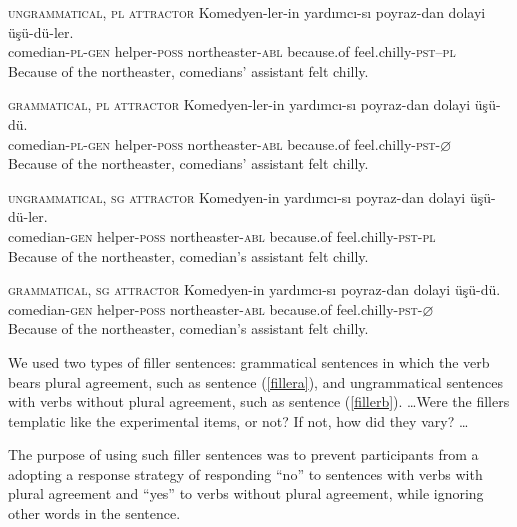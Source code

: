 \documentclass[english,doc]{apa6}
\begin{document}
\begin{exe}
\ex \label{exp1_item}
  \begin{xlist}

  \ex \textsc{ungrammatical, pl attractor} \label{exp1_a}
      \gll Komedyen-ler-in yardımcı-sı poyraz-dan dolayi ü\c{s}ü-dü-ler.\\
  comedian-\textsc{pl}-\textsc{gen} helper-\textsc{poss} northeaster-\textsc{abl} because.of feel.chilly-\textsc{pst}--\textsc{pl}\\
      \glt Because of the northeaster, comedians' assistant felt chilly.

  \ex \textsc{grammatical, pl attractor} \label{exp1_b}
      \gll Komedyen-ler-in yardımcı-sı poyraz-dan dolayi ü\c{s}ü-dü.\\
  comedian-\textsc{pl}-\textsc{gen} helper-\textsc{poss} northeaster-\textsc{abl} because.of feel.chilly-\textsc{pst}-$\varnothing$\\
      \glt Because of the northeaster, comedians' assistant felt chilly.

  \ex \textsc{ungrammatical, sg attractor} \label{exp1_c}
      \gll Komedyen-in yardımcı-sı poyraz-dan dolayi ü\c{s}ü-dü-ler.\\
  comedian-\textsc{gen} helper-\textsc{poss} northeaster-\textsc{abl} because.of feel.chilly-\textsc{pst}-\textsc{pl}\\
      \glt Because of the northeaster, comedian's assistant felt chilly.
  
  \ex \textsc{grammatical, sg attractor} \label{exp1_d}
      \gll Komedyen-in yardımcı-sı poyraz-dan dolayi ü\c{s}ü-dü.\\
  comedian-\textsc{gen} helper-\textsc{poss} northeaster-\textsc{abl} because.of feel.chilly-\textsc{pst}-$\varnothing$\\
      \glt Because of the northeaster, comedian's assistant felt chilly.

  \end{xlist}
\end{exe}

We used two types of filler sentences: grammatical sentences in which the verb bears plural agreement, such as sentence (\ref{fillera}), and ungrammatical sentences with verbs without plural agreement, such as sentence (\ref{fillerb}).
\ldots Were the fillers templatic like the experimental items, or not? If not, how did they vary? \ldots

The purpose of using such filler sentences was to prevent participants from a adopting a response strategy of responding \enquote{no} to sentences with verbs with plural agreement and \enquote{yes} to verbs without plural agreement, while ignoring other words in the sentence.
\end{document}
